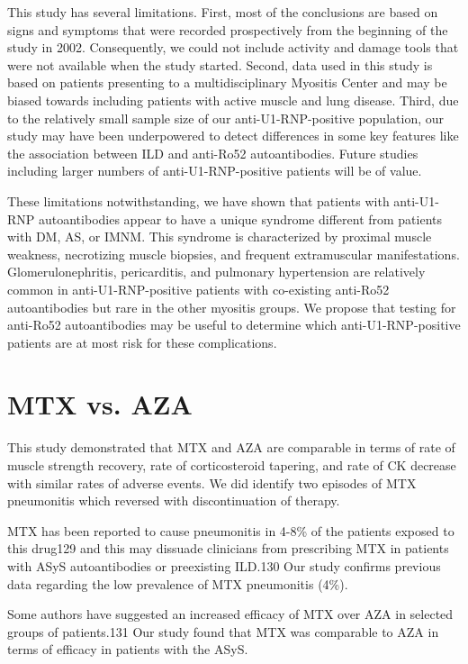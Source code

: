 This study has several limitations. First, most of the conclusions are based on signs and symptoms that were recorded prospectively from the beginning of the study in 2002. Consequently, we could not include activity and damage tools that were not available when the study started. Second, data used in this study is based on patients presenting to a multidisciplinary Myositis Center and may be biased towards including patients with active muscle and lung disease. Third, due to the relatively small sample size of our anti-U1-RNP-positive population, our study may have been underpowered to detect differences in some key features like the association between ILD and anti-Ro52 autoantibodies.  Future studies including larger numbers of anti-U1-RNP-positive patients will be of value. 

These limitations notwithstanding, we have shown that patients with anti-U1-RNP autoantibodies appear to have a unique syndrome different from patients with DM, AS, or IMNM.  This syndrome is characterized by proximal muscle weakness, necrotizing muscle biopsies, and frequent extramuscular manifestations.  Glomerulonephritis, pericarditis, and pulmonary hypertension are relatively common in anti-U1-RNP-positive patients with co-existing anti-Ro52 autoantibodies but rare in the other myositis groups. We propose that testing for anti-Ro52 autoantibodies may be useful to determine which anti-U1-RNP-positive patients are at most risk for these complications.

\section{MTX vs. AZA}

This study demonstrated that MTX and AZA are comparable in terms of rate of muscle strength recovery, rate of corticosteroid tapering, and rate of CK decrease with similar rates of adverse events. We did identify two episodes of MTX pneumonitis which reversed with discontinuation of therapy.

MTX has been reported to cause pneumonitis in 4-8\% of the patients exposed to this drug129 and this may dissuade clinicians from prescribing MTX in patients with ASyS autoantibodies or preexisting ILD.130 Our study confirms previous data regarding the low prevalence of MTX pneumonitis (4\%). 

Some authors have suggested an increased efficacy of MTX over AZA in selected groups of patients.131 Our study found that MTX was comparable to AZA in terms of efficacy in patients with the ASyS.

